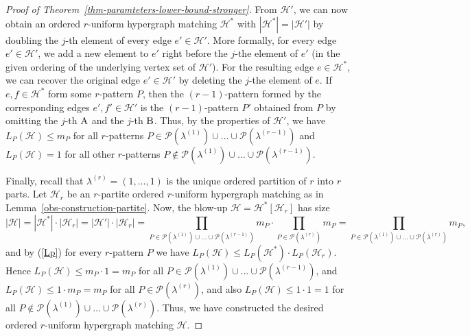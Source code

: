 \documentclass[10pt,a4paper]{amsart}
\theoremstyle{definition}
\newcommand{\HH}{\mathcal{H}}
\newcommand{\PP}{\mathcal{P}}
\begin{document}
\begin{proof}[Proof of Theorem~\ref{thm-paramteters-lower-bound-stronger}]
From $\HH'$, we can now obtain an ordered $r$-uniform hypergraph matching $\HH^*$ with $|\HH^*|=|\HH'|$ by doubling the $j$-th element of every edge $e'\in \HH'$. More formally, for every edge $e'\in \HH'$, we add a new element to $e'$ right before the $j$-the element of $e'$ (in the given ordering of the underlying vertex set of $\HH'$). For the resulting edge $e\in \HH^*$, we can recover the original edge $e'\in \HH'$ by deleting the $j$-the element of $e$. If $e,f\in \HH^*$ form some $r$-pattern $P$, then the $(r-1)$-pattern formed by the corresponding edges $e',f'\in \HH'$ is the $(r-1)$-pattern $P'$ obtained from $P$ by omitting the $j$-th $\rm A$ and the $j$-th $\rm B$. Thus, by the properties of $\HH'$, we have $L_P(\HH)\le m_P$ for all $r$-patterns $P\in \PP(\lambda^{(1)})\cup\dots\cup \PP(\lambda^{(r-1)})$ and $L_P(\HH)=1$ for all other $r$-patterns $P\not\in \PP(\lambda^{(1)})\cup\dots\cup \PP(\lambda^{(r-1)})$.

Finally, recall that $\lambda^{(r)}=(1,\dots,1)$ is the unique ordered partition of $r$ into $r$ parts. Let $\HH_r$ be an $r$-partite ordered $r$-uniform hypergraph matching as in Lemma~\ref{obs-construction-partite}. Now, the blow-up $\HH=\HH^*[\HH_r]$ has size
\[|\HH|=|\HH^*|\cdot |\HH_r|=|\HH'|\cdot |\HH_r|=\prod_{P\in \PP(\lambda^{(1)})\cup\dots\cup \PP(\lambda^{(r-1)})} m_{P}\cdot \prod_{P\in \PP(\lambda^{(r)})} m_{P}=\prod_{P\in \PP(\lambda^{(1)})\cup\dots\cup \PP(\lambda^{(r)})} m_{P},\]
and by (\ref{Lp}) for every $r$-pattern $P$ we have $L_P(\HH)\le L_P(\HH^*)\cdot L_P(\HH_r)$. Hence $L_P(\HH)\le m_P\cdot 1=m_P$ for all $P\in \PP(\lambda^{(1)})\cup\dots\cup \PP(\lambda^{(r-1)})$, and $L_P(\HH)\le 1\cdot m_P=m_P$ for all $P\in \PP(\lambda^{(r)})$, and also $L_P(\HH)\le 1\cdot 1=1$ for all $P\not\in \PP(\lambda^{(1)})\cup\dots\cup \PP(\lambda^{(r)})$. Thus, we have constructed the desired ordered $r$-uniform hypergraph matching $\HH$.
\end{proof}
\end{document}
